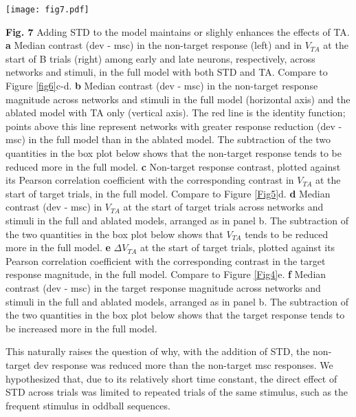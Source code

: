 \documentclass[pdflatex,referee,iicol,sn-basic]{sn-jnl}
\theoremstyle{thmstyleone}%
\theoremstyle{thmstyletwo}%
\theoremstyle{thmstylethree}%
\begin{document}
\begin{figure*}%
    \centering
    \texttt{[image: fig7.pdf]}
    \caption{}
    \label{fig7}
\end{figure*}
\textbf{Fig. 7} Adding STD to the model maintains or slighly enhances the effects of TA.
\textbf{a} Median contrast (dev - msc) in the non-target response (left) and in $V_{TA}$ at the start of B trials (right) among early and late neurons, respectively, across networks and stimuli, in the full model with both STD and TA. Compare to Figure \ref{fig6}c-d.
\textbf{b} Median contrast (dev - msc) in the non-target response magnitude across networks and stimuli in the full model (horizontal axis) and the ablated model with TA only (vertical axis). The red line is the identity function; points above this line represent networks with greater response reduction (dev - msc) in the full model than in the ablated model. The subtraction of the two quantities in the box plot below shows that the non-target response tends to be reduced more in the full model.
\textbf{c} Non-target response contrast, plotted against its Pearson correlation coefficient with the corresponding contrast in $V_{TA}$ at the start of target trials, in the full model. Compare to Figure \ref{Fig5}d.
\textbf{d} Median contrast (dev - msc) in $V_{TA}$ at the start of target trials across networks and stimuli in the full and ablated models, arranged as in panel b. The subtraction of the two quantities in the box plot below shows that $V_{TA}$ tends to be reduced more in the full model.
\textbf{e} $\Delta V_{TA}$ at the start of target trials, plotted against its Pearson correlation coefficient with the corresponding contrast in the target response magnitude, in the full model. Compare to Figure \ref{Fig4}e.
\textbf{f} Median contrast (dev - msc) in the target response magnitude across networks and stimuli in the full and ablated models, arranged as in panel b. The subtraction of the two quantities in the box plot below shows that the target response tends to be increased more in the full model.

This naturally raises the question of why, with the addition of STD, the non-target dev response was reduced more than the non-target msc responses. We hypothesized that, due to its relatively short time constant, the direct effect of STD across trials was limited to repeated trials of the same stimulus, such as the frequent stimulus in oddball sequences.
\end{document}
